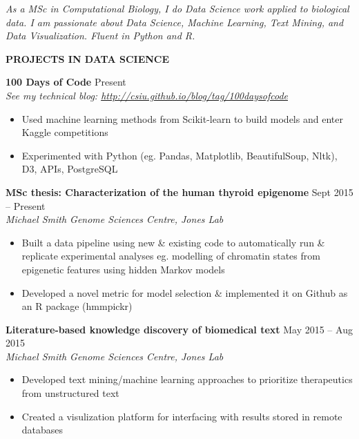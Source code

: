 \documentclass{res}
\renewcommand{\section}[1]{%
  \vspace{0.3in}%
  \centerline{\uppercase{\bf{#1}}}%
  \vspace{-6pt}}
\newcommand{\linehead}[2]{%
  {\bf #1} \hfill #2\\}
\newcommand{\linetitle}[1]{%
  {\sl #1}}
\begin{document}
\begin{resume}


\vspace{-1em}
\begin{center}
  {\it As a MSc in Computational Biology, I do Data Science work applied to biological data. I am passionate about Data Science, Machine Learning, Text Mining, and Data Visualization. Fluent in Python and R.}
\end{center}
\vspace{-1.5em}

\section{Projects in Data science}

\linehead{100 Days of Code}{Present}
\linetitle{See my technical blog: \url{http://csiu.github.io/blog/tag/100daysofcode}}
\begin{itemize}
  \item Used machine learning methods from Scikit-learn to build models and enter Kaggle competitions
  \item Experimented with Python (eg. Pandas, Matplotlib, BeautifulSoup, Nltk), D3, APIs, PostgreSQL
\end{itemize}

\linehead{MSc thesis: Characterization of the human thyroid epigenome}{Sept 2015 -- Present}
\linetitle{Michael Smith Genome Sciences Centre, Jones Lab}
\begin{itemize}
  \item Built a data pipeline using new \& existing code to automatically run \& replicate experimental analyses
  eg. modelling of chromatin states from epigenetic features using hidden Markov models
  \item Developed a novel metric for model selection \& implemented it on Github as an R package (hmmpickr)
\end{itemize}

\linehead{Literature-based knowledge discovery of biomedical text}{May 2015 -- Aug 2015}
\linetitle{Michael Smith Genome Sciences Centre, Jones Lab}
\begin{itemize}
  \item Developed text mining/machine learning approaches to prioritize therapeutics from unstructured text
  \item Created a visulization platform for interfacing with results stored in remote databases
\end{itemize}


\end{resume}
\end{document}

